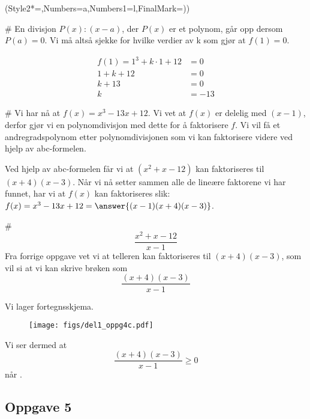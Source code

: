 \begin{easylist}[enumerate]
	\ListProperties(Style2*=,Numbers=a,Numbers1=l,FinalMark={)})
	
	# En divisjon $P(x) : (x-a)$, der $P(x)$ er et polynom, går opp dersom $P(a) = 0$. Vi må altså sjekke for hvilke verdier av k som gjør at $f(1)= 0$.\newline
	
	\begin{equation*}
		\begin{aligned}
		f(1) = 1^3 + k \cdot 1 + 12 &= 0 \\
		1+k+12 & =0 \\
		k + 13 & = 0 \\
		k & = -13 
		\end{aligned}
	\end{equation*}
	
	# Vi har nå at $f(x) = x^3 - 13x + 12$. Vi vet at $f(x)$ er delelig med $(x-1)$, derfor gjør vi en polynomdivisjon med dette for å faktorisere $f$. Vi vil få et andregradspolynom etter polynomdivisjonen som vi kan faktorisere videre ved hjelp av abc-formelen. \newline
	 \\ \newline
	
	Ved hjelp av abc-formelen får vi at $(x^2 + x -12 )$ kan faktoriseres til $(x+4)(x-3)$. Når vi nå setter sammen alle de lineære faktorene vi har funnet, har vi at $f(x)$ kan faktoriseres slik: $f(x) = x^3 - 13x + 12 = \answer{(x-1)(x+4)(x-3)}$.
	
	# $$\frac{x^2 + x -12}{x-1}$$
	Fra forrige oppgave vet vi at telleren kan faktoriseres til $(x+4)(x-3)$, som vil si at vi kan skrive brøken som $$\frac{(x+4)(x-3)}{x-1}$$
	
	Vi lager fortegnsskjema. 
	\begin{figure}[ht!]
		\centering
		\texttt{[image: figs/del1\_oppg4c.pdf]}
		\label{fig:del1_oppg4c}
	\end{figure}
	
	Vi ser dermed at $$\frac{(x+4)(x-3)}{x-1} \geq 0$$ når .
	
\end{easylist}

\subsection*{Oppgave 5}

